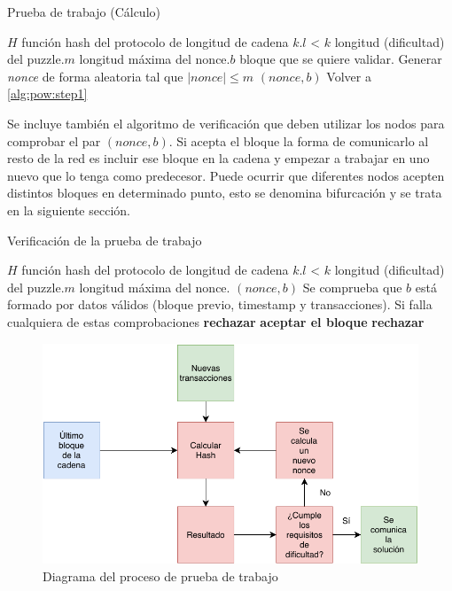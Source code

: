 \begin{algorithm}
\caption{Prueba de trabajo (Cálculo)}\label{alg:pow}
\begin{algorithmic}[1]
\Require \Statex $H$ función hash del protocolo de longitud de cadena $k$.\Statex $l$ < $k$ longitud (dificultad) del puzzle.\Statex $m$ longitud máxima del nonce.\Statex $b$ bloque que se quiere validar.
\State Generar \textit{nonce} de forma aleatoria tal que $|nonce| \leq m$ \label{alg:pow:step1}
 \Return $(nonce, b)$
\Else  Volver a  \ref{alg:pow:step1}
\EndIf
\end{algorithmic}
\end{algorithm}

Se incluye también el algoritmo de verificación que deben utilizar los nodos para comprobar el par $(nonce, b)$. Si acepta el bloque la forma de comunicarlo al resto de la red es incluir ese bloque en la cadena y empezar a trabajar en uno nuevo que lo tenga como predecesor. Puede ocurrir que diferentes nodos acepten distintos bloques en determinado punto, esto se denomina bifurcación y se trata en la siguiente sección.
\begin{algorithm}
\caption{Verificación de la prueba de trabajo}\label{alg:pow_check}
\begin{algorithmic}[1]
\Require \Statex $H$ función hash del protocolo de longitud de cadena $k$.\Statex $l$ < $k$ longitud (dificultad) del puzzle.\Statex $m$ longitud máxima del nonce. \Statex $(nonce, b)$
\State Se comprueba que $b$ está formado por datos válidos (bloque previo, timestamp y transacciones). Si falla cualquiera de estas comprobaciones \textbf{rechazar}
 \Return \textbf{aceptar el bloque}
\Else  \textbf{ rechazar}
\EndIf
\end{algorithmic}
\end{algorithm}

\begin{figure}[H]
  \begin{center}
  \includegraphics[width=14cm]{figures/Pow_diagram.pdf}
  \end{center}
  \caption{Diagrama del proceso de prueba de trabajo}%

	\label{fig:flux}%
\end{figure}

